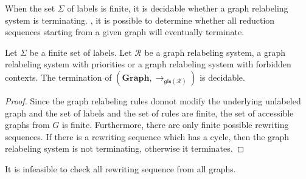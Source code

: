 \color{red}
  When the set $\Sigma$ of labels is finite, it is decidable whether a graph relabeling system is terminating.
, it is possible to determine whether all reduction sequences starting from a given graph will eventually terminate. 

\begin{proposition}
  Let $\Sigma$ be a finite set of labels.  Let $\mathcal{R}$ be a graph relabeling system, a graph relabeling system with priorities or a graph relabeling system with forbidden contexts. The termination of $(\textbf{Graph}, \to_{\mathfrak{gls(\mathcal{R})}})$ is decidable.
  \end{proposition}
  \begin{proof}
     Since the graph relabeling rules donnot modify the underlying unlabeled graph and the set of labels and the set of rules are finite, the set of accessible graphs from $G$ is finite. Furthermore, there are only finite possible rewriting sequences. If there is a rewriting sequence which has a cycle, then the graph relabeling system is not terminating, otherwise it terminates.
  \end{proof}

\begin{remark}
  It is infeasible to check all rewriting sequence from all graphs.
\end{remark}
\color{black}